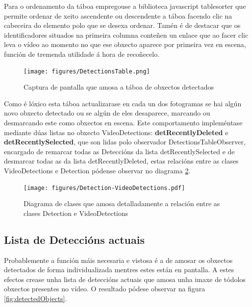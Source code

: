         Para o ordenamento da táboa empregouse a biblioteca javascript tablesorter que permite ordenar
        de xeito ascendente ou descendente a táboa facendo clic na cabeceira do elemento polo que se desexa
        ordenar. Tamén é de destacar que os identificadores situados na primeira columna conteñen un 
        enlace que ao facer clic leva o vídeo ao momento no que ese obxecto aparece por primeira vez en
        escena, función de tremenda utilidade á hora de recoñecelo.
        
        \begin{figure}[htp]
        \begin{center}
            \texttt{[image: figures/DetectionsTable.png]}
            \caption{Captura de pantalla que amosa a táboa de obxectos detectados}
        \label{fig:DetectionsTable}
        \end{center}
        \end{figure}
        
        Como é lóxico esta táboa actualizarase en cada un dos fotogramas se hai algún novo obxecto 
        detectado ou se algún de eles desaparece, marcando ou desmarcando este como obxectos en escena.
        Este comportamento impleméntase mediante dúas listas no obxecto VideoDetections: 
        \textbf{detRecentlyDeleted} e \textbf{detRecentlySelected}, que son lidas polo observador 
        DetectionsTableObserver, encargado de remarcar todas as Deteccións da lista detRecentlySelected
        e de desmarcar todas as da lista detRecentlyDeleted, estas relacións entre as clases 
        VideoDetections e Detection pódense observar no diagrama \ref{fig:Detection-VideoDetections}.
        
        \begin{figure}[htp]
        \begin{center}
            \texttt{[image: figures/Detection-VideoDetections.pdf]}
            \caption{Diagrama de clases que amosa detalladamente a relación entre as clases Detection
            e VideoDetections}
        \label{fig:Detection-VideoDetections}
        \end{center}
        \end{figure}
        
    \subsection{Lista de Deteccións actuais}

        Probablemente a función máis necesaria e vistosa é a de amosar os obxectos detectados de forma 
        individualizada mentres estes están en pantalla. A estes efectos crease unha lista de deteccións
        actuais que amosa unha imaxe de tódolos obxectos presentes no vídeo. O resultado pódese observar
        na figura \ref{fig:detectedObjects}.
        

